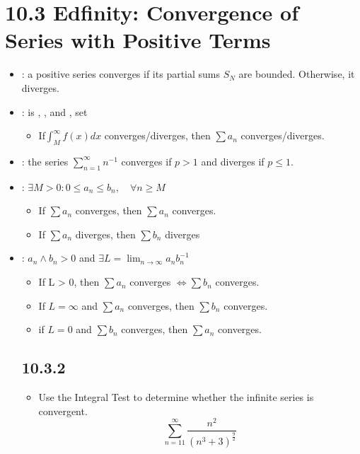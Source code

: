 \section{10.3 Edfinity: Convergence of Series with Positive Terms}
\begin{itemize}
  \item {}:  a positive series
      converges if its partial sums \(S_N\) are bounded. Otherwise, it diverges.
  \item {}:  is , , and
    , set 
    \begin{itemize}
      \item If\(\int_{M}^{\infty} f (x) dx \) converges/diverges, then \(\sum
        a_n\) converges/diverges.
    \end{itemize}

  \item {}: the series \(\sum_{n=1}^{\infty} n^{-1}\)
    converges if \(p>1\) and diverges if \(p \leq 1\).

  \item {}: \(\exists M > 0 : 0 \leq a_n \leq b_n, \quad\forall n \geq M\)
    \begin{itemize}
      \item If \(\sum a_n\) converges, then \(\sum a_n\) converges.
      \item  If \(\sum a_n\) diverges, then \(\sum b_n\) diverges
    \end{itemize}

  \item {}: \({a_n} \land {b_n} > 0\) and \(\exists L = \lim_{n \to \infty} a_n b_n^{-1}\)
    \begin{itemize}
      \item If L > 0, then \(\sum a_n\) converges \(\iff \sum b_n\) converges.
      \item If \(L=\infty\) and \(\sum a_n\) converges, then \(\sum b_n\) converges.
      \item if \(L = 0\) and \(\sum b_n\) converges, then \(\sum a_n\) converges.
    \end{itemize}

    \subsection{10.3.2}
    \begin{itemize}
      \item Use the Integral Test to determine whether the infinite series is
        convergent.
        \[%
          \sum_{n=11}^{\infty} \frac{n^2}{(n^3 + 3)^{\frac{9}{2}}}
        \]%
    \end{itemize}

\end{itemize}
